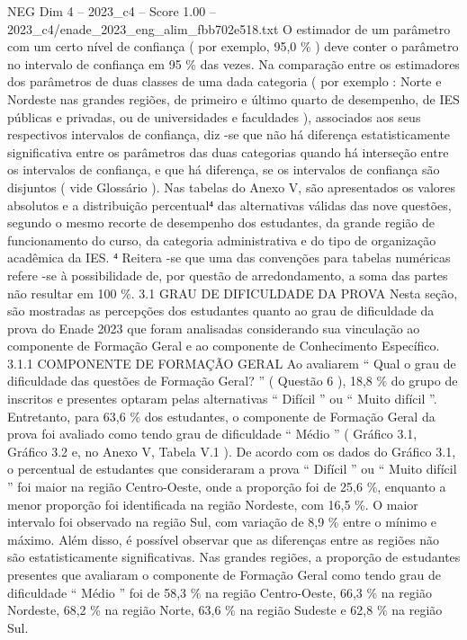 \begin{textsample}{NEG Dim 4 – 2023\_c4 – Score 1.00 – 2023\_c4/enade\_2023\_eng\_alim\_fbb702e518.txt}
O estimador de um parâmetro com um certo nível de confiança ( por exemplo, 95,0 \% ) deve conter o parâmetro no intervalo de confiança em 95 \% das vezes.
Na comparação entre os estimadores dos parâmetros de duas classes de uma dada categoria ( por exemplo : Norte e Nordeste nas grandes regiões, de primeiro e último quarto de desempenho, de IES públicas e privadas, ou de universidades e faculdades ), associados aos seus respectivos intervalos de confiança, diz -se que não há diferença estatisticamente significativa entre os parâmetros das duas categorias quando há interseção entre os intervalos de confiança, e que há diferença, se os intervalos de confiança são disjuntos ( vide Glossário ).
Nas tabelas do Anexo V, são apresentados os valores absolutos e a distribuição percentual⁴ das alternativas válidas das nove questões, segundo o mesmo recorte de desempenho dos estudantes, da grande região de funcionamento do curso, da categoria administrativa e do tipo de organização acadêmica da IES. ⁴ Reitera -se que uma das convenções para tabelas numéricas refere -se à possibilidade de, por questão de arredondamento, a soma das partes não resultar em 100 \%. 3.1 GRAU DE DIFICULDADE DA PROVA Nesta seção, são mostradas as percepções dos estudantes quanto ao grau de dificuldade da prova do Enade 2023 que foram analisadas considerando sua vinculação ao componente de Formação Geral e ao componente de Conhecimento Específico. 3.1.1 COMPONENTE DE FORMAÇÃO GERAL Ao avaliarem “ Qual o grau de dificuldade das questões de Formação Geral? ” ( Questão 6 ), 18,8 \% do grupo de inscritos e presentes optaram pelas alternativas “ Difícil ” ou “ Muito difícil ”.
Entretanto, para 63,6 \% dos estudantes, o componente de Formação Geral da prova foi avaliado como tendo grau de dificuldade “ Médio ” ( Gráfico 3.1, Gráfico 3.2 e, no Anexo V, Tabela V.1 ).
De acordo com os dados do Gráfico 3.1, o percentual de estudantes que consideraram a prova “ Difícil ” ou “ Muito difícil ” foi maior na região Centro-Oeste, onde a proporção foi de 25,6 \%, enquanto a menor proporção foi identificada na região Nordeste, com 16,5 \%.
O maior intervalo foi observado na região Sul, com variação de 8,9 \% entre o mínimo e máximo.
Além disso, é possível observar que as diferenças entre as regiões não são estatisticamente significativas.
Nas grandes regiões, a proporção de estudantes presentes que avaliaram o componente de Formação Geral como tendo grau de dificuldade “ Médio ” foi de 58,3 \% na região Centro-Oeste, 66,3 \% na região Nordeste, 68,2 \% na região Norte, 63,6 \% na região Sudeste e 62,8 \% na região Sul.

\end{textsample}
